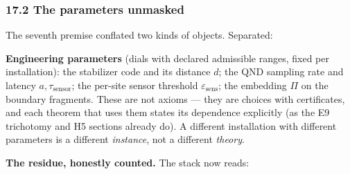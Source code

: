 \documentclass[
]{article}
\begin{document}
\subsubsection{17.2 The parameters
unmasked}\label{the-parameters-unmasked}

The seventh premise conflated two kinds of objects. Separated:

\textbf{Engineering parameters} (dials with declared admissible ranges,
fixed per installation): the stabilizer code and its distance \(d\); the
QND sampling rate and latency \(a,\tau_{\mathrm{sensor}}\); the per-site
sensor threshold \(\varepsilon_{\mathrm{sens}}\); the embedding \(\Pi\)
on the boundary fragments. These are not axioms --- they are choices
with certificates, and each theorem that uses them states its dependence
explicitly (as the E9 trichotomy and H5 sections already do). A
different installation with different parameters is a different
\emph{instance}, not a different \emph{theory}.

\textbf{The residue, honestly counted.} The stack now reads:
\end{document}
